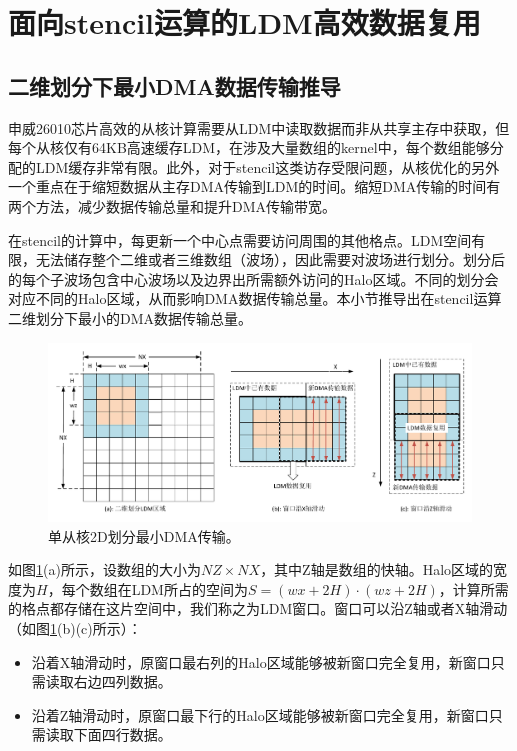\documentclass[degree=doctor]{thuthesis}
\begin{document}




\section{面向stencil运算的LDM高效数据复用} %
\label{sec:面向stencil运算的ldm高效数据复用}

\subsection{二维划分下最小DMA数据传输推导} %
\label{ sub:二维划分下最小DMA数据传输推导}

申威26010芯片高效的从核计算需要从LDM中读取数据而非从共享主存中获取，但每个从核仅有64KB高速缓存LDM，在涉及大量数组的kernel中，每个数组能够分配的LDM缓存非常有限。此外，对于stencil这类访存受限问题，从核优化的另外一个重点在于缩短数据从主存DMA传输到LDM的时间。缩短DMA传输的时间有两个方法，减少数据传输总量和提升DMA传输带宽。

在stencil的计算中，每更新一个中心点需要访问周围的其他格点。LDM空间有限，无法储存整个二维或者三维数组（波场），因此需要对波场进行划分。划分后的每个子波场包含中心波场以及边界出所需额外访问的Halo区域。不同的划分会对应不同的Halo区域，从而影响DMA数据传输总量。本小节推导出在stencil运算二维划分下最小的DMA数据传输总量。

\begin{figure}[ht]
  \centering
  \includegraphics[width=1.0\columnwidth]{单从核2D划分最小DMA传输.pdf}
  \caption{单从核2D划分最小DMA传输。}
  \label{fig:cpe-2d-derive}
\end{figure}

如图\ref{fig:cpe-2d-derive}(a)所示，设数组的大小为$NZ\times NX$，其中Z轴是数组的快轴。Halo区域的宽度为$H$，每个数组在LDM所占的空间为$S=(wx+2H)\cdot(wz+2H)$，计算所需的格点都存储在这片空间中，我们称之为LDM窗口。窗口可以沿Z轴或者X轴滑动（如图\ref{fig:cpe-2d-derive}(b)(c)所示）：
\begin{itemize}
  \item 沿着X轴滑动时，原窗口最右列的Halo区域能够被新窗口完全复用，新窗口只需读取右边四列数据。
  \item 沿着Z轴滑动时，原窗口最下行的Halo区域能够被新窗口完全复用，新窗口只需读取下面四行数据。
\end{itemize}
\end{document}
